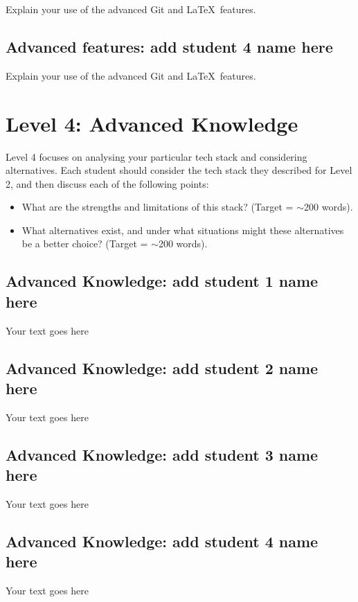 \documentclass[a4paper, 11pt]{report}
\begin{document}
Explain your use of the advanced Git and \LaTeX\ features. 

\subsection{Advanced features: add student 4 name here}

Explain your use of the advanced Git and \LaTeX\ features. 




\newpage
\section{Level 4: Advanced Knowledge}

Level 4 focuses on analysing your particular tech stack and considering alternatives. Each student should consider the tech stack they described for Level 2, and then discuss each of the following points:
\begin{itemize}
    \item What are the strengths and limitations of this stack? (Target = $\sim$200 words).
    \item What alternatives exist, and under what situations might these alternatives be a better choice? (Target = $\sim$200 words).
\end{itemize}

\subsection{Advanced Knowledge: add student 1 name here}

Your text goes here

\subsection{Advanced Knowledge: add student 2 name here}

Your text goes here

\subsection{Advanced Knowledge: add student 3 name here}

Your text goes here

\subsection{Advanced Knowledge: add student 4 name here}

Your text goes here




\newpage



\end{document}
